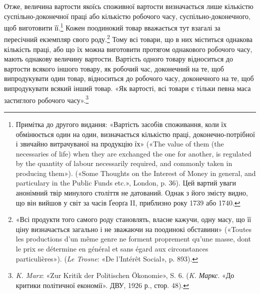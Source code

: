 Отже, величина вартости якоїсь споживної вартости визначається
лише кількістю суспільно-доконечної праці або кількістю
робочого часу, суспільно-доконечного, щоб виготовити
її.\footnote{
Примітка до другого видання: «Вартість засобів споживання, коли
їх обмінюється один на один, визначається кількістю праці, доконечно-потрібної
і звичайно витрачуваної на продукцію їх» («The value of them
(the necessaries of life) when they are exchanged the one for another, is
regulated by the quantity of labour necessarily required, and commonly
taken in producing them»). («Some Thoughts on the Interest of Money in
general, and particulary in the Public Funds etc.», London, p. 36). Цей
вартий уваги анонімний твір минулого століття не датований. Однак
з його змісту видно, що він вийшов у світ за часів Ґеорґа II, приблизно
року 1739 або 1740.
} Кожен поодинокий товар вважається тут взагалі за пересічний
екземпляр свого роду.\footnote{
«Всі продукти того самого роду становлять, власне кажучи, одну
масу, що її ціну визначається загально і не зважаючи на поодинокі обставини»
(«Toutes les productions d’un même genre ne forment proprement
qu’une masse, dont le prix se détermine en général et sans égard aux circonstances
particulières»). (\emph{Le Trosne}: «De l’Intérêt Social», p. 893).
} Тому всі товари, що в них міститься
однакова кількість праці, або що їх можна виготовити протягом
однакового робочого часу, мають однакову величину вартости.
Вартість одного товару відноситься до вартости всякого іншого
товару, як робочий час, доконечний на те, щоб випродукувати
один товар, відноситься до робочого часу, доконечного на те,
щоб випродукувати всякий інший товар. «Як вартості, всі товари
є тільки певна маса застиглого робочого часу».\footnote{
\emph{K. Marx}: «Zur Kritik der Politischen Ökonomie», S. 6. (\emph{K. Маркс}.
«До критики політичної економії». ДВУ, 1926 р., стор. 48).
}
